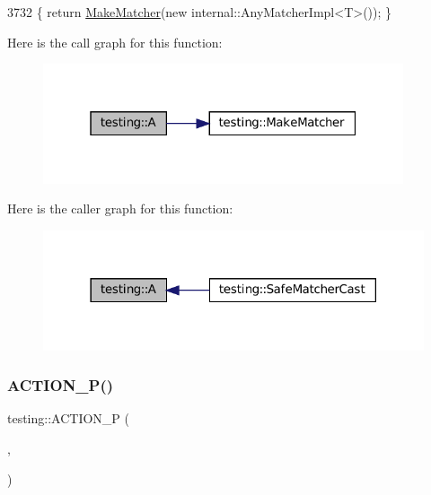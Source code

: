 \begin{DoxyCode}
3732 \{ \textcolor{keywordflow}{return} \hyperlink{namespacetesting_a37fd8029ac00e60952440a3d9cca8166}{MakeMatcher}(\textcolor{keyword}{new} internal::AnyMatcherImpl<T>()); \}
\end{DoxyCode}
Here is the call graph for this function\+:
\nopagebreak
\begin{figure}[H]
\begin{center}
\leavevmode
\includegraphics[width=301pt]{namespacetesting_a5e9134d655d2fc9323902348083282e7_cgraph}
\end{center}
\end{figure}
Here is the caller graph for this function\+:
\nopagebreak
\begin{figure}[H]
\begin{center}
\leavevmode
\includegraphics[width=318pt]{namespacetesting_a5e9134d655d2fc9323902348083282e7_icgraph}
\end{center}
\end{figure}
\mbox{\label{namespacetesting_a3d58f0d746946064154cd257d368599d}} 
\subsubsection{\texorpdfstring{A\+C\+T\+I\+O\+N\+\_\+\+P()}{ACTION\_P()}}
{\footnotesize\ttfamily testing\+::\+A\+C\+T\+I\+O\+N\+\_\+P (\begin{DoxyParamCaption}\item[{Return\+Pointee}]{,  }\item[{pointer}]{ }\end{DoxyParamCaption})}



